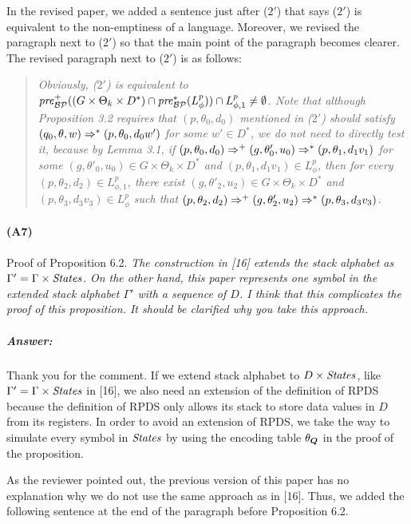 \documentclass{article}
\begin{document}
In the revised paper,
we added a sentence just after ($2'$) that says
($2'$) is equivalent to the non-emptiness of a language.
Moreover, we revised the paragraph next to ($2'$)
so that the main point of the paragraph becomes clearer.
The revised paragraph next to ($2'$) is as follows:
\begin{quote}\em
  Obviously, ($2'$) is equivalent to
  $\mathit{pre}_{{{\cal B}{\cal P}}}^+((G\times\Theta_k\times D^*)\cap
  \mathit{pre}_{{{\cal B}{\cal P}}}^*(L_{\phi}^p))
  \cap L_{\phi,1}^p \neq\emptyset$.
  Note that although Proposition 3.2
  requires that
  $(p,\theta_0,d_0)$ mentioned in ($2'$) should satisfy
  $(q_0,\theta,w)\Rightarrow^* (p,\theta_0,d_0w')$
  for some $w'\in D^*$,
  we do not need to directly test it,
  because by Lemma 3.1,
  if $(p,\theta_0,d_0) \Rightarrow^+ (g,\theta'_0,u_0) \Rightarrow^*
  (p,\theta_1,d_1v_1)$
  for some %
  $(g,\theta'_0,u_0)\in G\times\Theta_k\times D^*$
  and $(p,\theta_1,d_1v_1)\in L_{\phi}^p$,
  then
  for \emph{every}
  $(p,\theta_2,d_2)\in L_{\phi,1}^p$,
  there exist $(g,\theta'_2,u_2)\in G\times\Theta_k\times D^*$
  and $(p,\theta_3,d_3v_3)\in L_{\phi}^p$
  such that
  $(p,\theta_2,d_2) \Rightarrow^+ (g,\theta'_2,u_2) \Rightarrow^*
  (p,\theta_3,d_3v_3)$.
\end{quote}


\paragraph{(A7)} Proof of Proposition 6.2. \newline
\textit{
The construction in [16] extends the stack alphabet as $\Gamma'=\Gamma\times\mathit{States}$.
On the other hand, this paper represents one symbol in the extended stack alphabet $\Gamma'$ with a sequence of $D$. I think that this complicates the proof of this proposition. It should be clarified why you take this approach.
}
\subparagraph{Answer:}
Thank you for the comment.
If we extend stack alphabet to $D\times\mathit{States}$, like $\Gamma'=\Gamma\times\mathit{States}$ in [16],
we also need an extension of the definition of RPDS
because the definition of RPDS only allows its stack to
store data values in $D$ from its registers.
In order to avoid an extension of RPDS,
we take the way to simulate every symbol in $\mathit{States}$
by using the encoding table $\theta_{\boldsymbol Q}$ in the proof of the proposition.

As the reviewer pointed out,
the previous version of this paper has no explanation why
we do not use the same approach as in [16].
Thus, we added the following sentence at the end of the paragraph before Proposition 6.2.
\end{document}
